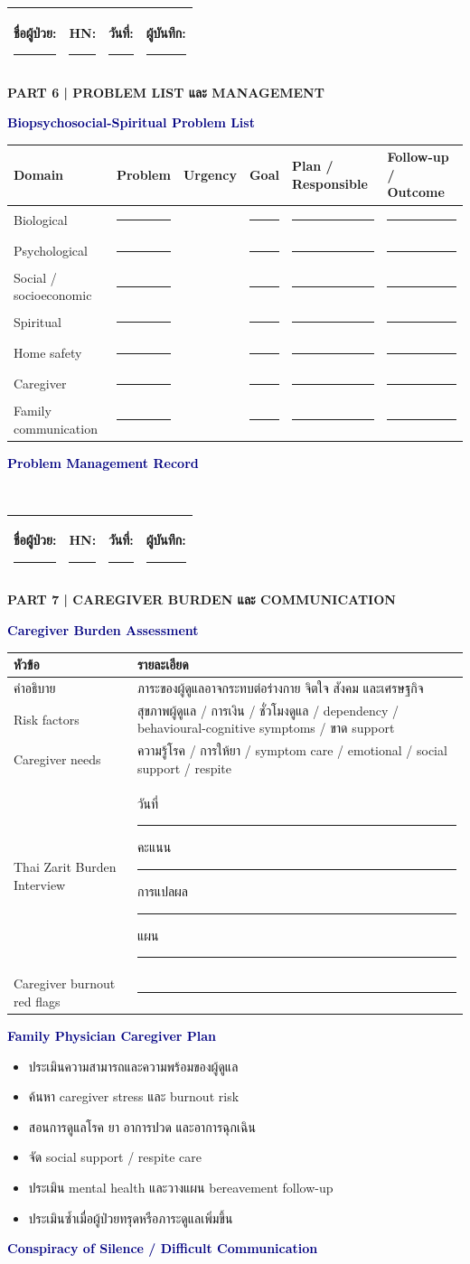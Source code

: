 \documentclass[12pt,a4paper]{article}
\newlength{\blanklen}
\newcommand{\blank}[1][4cm]{\setlength{\blanklen}{#1}\ifdim\blanklen>2cm\setlength{\blanklen}{2cm}\fi\rule{\blanklen}{0.4pt}}
\newcommand{\patientline}{\begin{tabularx}{\textwidth}{|X|X|X|X|}\hline ชื่อผู้ป่วย: \blank[2.8cm] & HN: \blank[1.4cm] & วันที่: \blank[1.4cm] & ผู้บันทึก: \blank[1.5cm]\\\hline\end{tabularx}\vspace{3pt}}
\newcommand{\sectiontitle}[1]{\vspace{4pt}\begin{tcolorbox}[colback=navy,colframe=navy,boxrule=0pt,arc=1pt,left=5pt,right=5pt,top=3pt,bottom=3pt]\color{white}\large\textbf{#1}\end{tcolorbox}}
\newcommand{\sub}[1]{\par\vspace{3pt}\noindent\textcolor{navy}{\large\textbf{#1}}\par\vspace{1pt}}
\newcommand{\lines}[1]{\begin{tcolorbox}[colback=white,colframe=gray!55,boxrule=0.4pt,arc=1pt,height=#1]\ \end{tcolorbox}}
\begin{document}
\newpage\patientline\sectiontitle{PART 6 | PROBLEM LIST และ MANAGEMENT}\sub{Biopsychosocial-Spiritual Problem List}\begin{tabularx}{\textwidth}{|p{1.8cm}|X|p{2cm}|X|X|p{2.2cm}|}\hline\rowcolor{navy}\color{white}Domain&\color{white}Problem&\color{white}Urgency&\color{white}Goal&\color{white}Plan / Responsible&\color{white}Follow-up / Outcome\\\hline Biological&\blank[2.3cm]& &\blank[2cm]&\blank[2.8cm]&\blank[1.7cm]\\\hline Psychological&\blank[2.3cm]& &\blank[2cm]&\blank[2.8cm]&\blank[1.7cm]\\\hline Social / socioeconomic&\blank[2.3cm]& &\blank[2cm]&\blank[2.8cm]&\blank[1.7cm]\\\hline Spiritual&\blank[2.3cm]& &\blank[2cm]&\blank[2.8cm]&\blank[1.7cm]\\\hline Home safety&\blank[2.3cm]& &\blank[2cm]&\blank[2.8cm]&\blank[1.7cm]\\\hline Caregiver&\blank[2.3cm]& &\blank[2cm]&\blank[2.8cm]&\blank[1.7cm]\\\hline Family communication&\blank[2.3cm]& &\blank[2cm]&\blank[2.8cm]&\blank[1.7cm]\\\hline\end{tabularx}\sub{Problem Management Record}\lines{11cm}

\newpage\patientline\sectiontitle{PART 7 | CAREGIVER BURDEN และ COMMUNICATION}\sub{Caregiver Burden Assessment}\begin{tabularx}{\textwidth}{|p{}|X|}\hline\rowcolor{navy}\color{white}หัวข้อ&\color{white}รายละเอียด\\\hline คำอธิบาย&ภาระของผู้ดูแลอาจกระทบต่อร่างกาย จิตใจ สังคม และเศรษฐกิจ\\\hline Risk factors&สุขภาพผู้ดูแล / การเงิน / ชั่วโมงดูแล / dependency / behavioural-cognitive symptoms / ขาด support\\\hline Caregiver needs&ความรู้โรค / การให้ยา / symptom care / emotional / social support / respite\\\hline Thai Zarit Burden Interview&วันที่ \blank[2cm] คะแนน \blank[1cm] การแปลผล \blank[3cm] แผน \blank[3cm]\\\hline Caregiver burnout red flags&\blank[10cm]\\\hline\end{tabularx}\sub{Family Physician Caregiver Plan}\begin{itemize}\item ประเมินความสามารถและความพร้อมของผู้ดูแล\item ค้นหา caregiver stress และ burnout risk\item สอนการดูแลโรค ยา อาการปวด และอาการฉุกเฉิน\item จัด social support / respite care\item ประเมิน mental health และวางแผน bereavement follow-up\item ประเมินซ้ำเมื่อผู้ป่วยทรุดหรือภาระดูแลเพิ่มขึ้น\end{itemize}\sub{Conspiracy of Silence / Difficult Communication}\lines{7.2cm}
\end{document}
